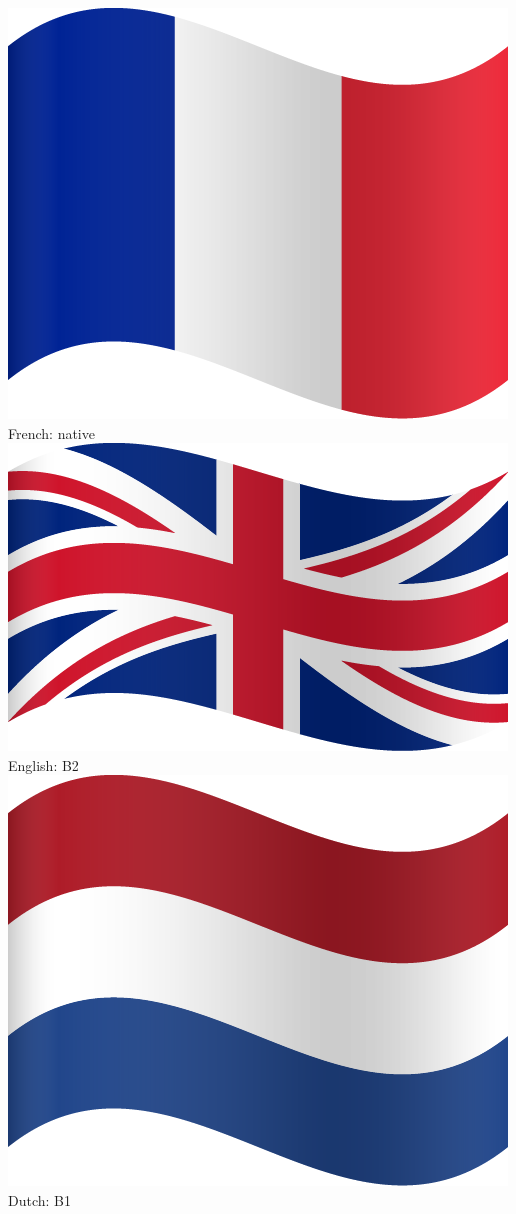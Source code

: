 \documentclass[]{deedy-resume-openfont}
\begin{document}
\begin{minipage}[t]{0.35\textwidth}
\includegraphics[scale=0.015]{images/france.png}  French: native \\
\includegraphics[scale=0.015]{images/uk.png}  English: B2 \\
\includegraphics[scale=0.015]{images/netherlands.png}  Dutch: B1 \\

\end{minipage}
\end{document}
